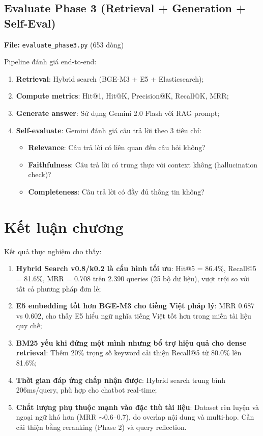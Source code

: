 \documentclass[../DoAn.tex]{subfiles}
\begin{document}
\subsection{Evaluate Phase 3 (Retrieval + Generation + Self-Eval)}
\textbf{File:} \texttt{evaluate\_phase3.py} (653 dòng)

Pipeline đánh giá end-to-end:
\begin{enumerate}
    \item \textbf{Retrieval}: Hybrid search (BGE-M3 + E5 + Elasticsearch);
    \item \textbf{Compute metrics}: Hit@1, Hit@K, Precision@K, Recall@K, MRR;
    \item \textbf{Generate answer}: Sử dụng Gemini 2.0 Flash với RAG prompt;
    \item \textbf{Self-evaluate}: Gemini đánh giá câu trả lời theo 3 tiêu chí:
    \begin{itemize}
        \item \textbf{Relevance}: Câu trả lời có liên quan đến câu hỏi không?
        \item \textbf{Faithfulness}: Câu trả lời có trung thực với context không (hallucination check)?
        \item \textbf{Completeness}: Câu trả lời có đầy đủ thông tin không?
    \end{itemize}
\end{enumerate}

\section{Kết luận chương}

Kết quả thực nghiệm cho thấy:

\begin{enumerate}
    \item \textbf{Hybrid Search v0.8/k0.2 là cấu hình tối ưu}: Hit@5 = 86.4\%, Recall@5 = 81.6\%, MRR = 0.708 trên 2.390 queries (25 bộ dữ liệu), vượt trội so với tất cả phương pháp đơn lẻ;
    
    \item \textbf{E5 embedding tốt hơn BGE-M3 cho tiếng Việt pháp lý}: MRR 0.687 vs 0.602, cho thấy E5 hiểu ngữ nghĩa tiếng Việt tốt hơn trong miền tài liệu quy chế;
    
    \item \textbf{BM25 yếu khi đứng một mình nhưng bổ trợ hiệu quả cho dense retrieval}: Thêm 20\% trọng số keyword cải thiện Recall@5 từ 80.0\% lên 81.6\%;
    
    \item \textbf{Thời gian đáp ứng chấp nhận được}: Hybrid search trung bình 206ms/query, phù hợp cho chatbot real-time;
    
    \item \textbf{Chất lượng phụ thuộc mạnh vào đặc thù tài liệu}: Dataset rèn luyện và ngoại ngữ khó hơn (MRR $\sim$0.6--0.7), do overlap nội dung và multi-hop. Cần cải thiện bằng reranking (Phase 2) và query reflection.
\end{enumerate}
\end{document}
